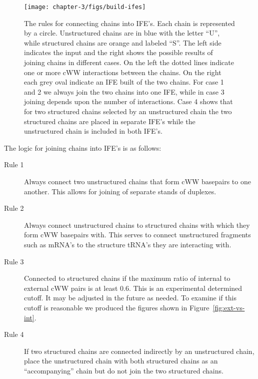 \begin{figure}
  \texttt{[image: chapter-3/figs/build-ifes]}
  \caption{The rules for connecting chains into IFE's. Each chain is
    represented by a circle. Unstructured chains are in blue with the letter
    ``U'', while structured chains are orange and labeled ``S''. The left side
    indicates the input and the right shows the possible results of joining
    chains in different cases. On the left the dotted lines indicate one or more
    cWW interactions between the chains. On the right each grey oval indicate
    an IFE built of the two chains. For case 1 and 2 we always join the two
    chains into one IFE, while in case 3 joining depends upon the number of
    interactions. Case 4 shows that for two structured chains selected by an
    unstructured chain the two structured chains are placed in separate IFE's
    while the unstructured chain is included in both IFE's.}
\label{fig:build-ife}
\end{figure}

The logic for joining chains into IFE's is as follows:

\begin{description}
  \item[Rule 1] Always connect two unstructured chains that form cWW basepairs
    to one another. This
    allows for joining of separate stands of duplexes.

  \item[Rule 2] Always connect unstructured chains to structured chains with
    which they form cWW basepairs with. This serves to connect unstructured
    fragments such as mRNA's to the structure tRNA's they are interacting with.

  \item[Rule 3] Connected to structured chains if the maximum ratio of internal
    to external cWW pairs is at least 0.6. This is an experimental determined
    cutoff. It may be adjusted in the future as needed. To examine if this
    cutoff is reasonable we produced the figures shown in
    Figure~\ref{fig:ext-vs-int}.

  \item[Rule 4] If two structured chains are connected indirectly by an
    unstructured chain, place the unstructured chain with both structured chains
    as an ``accompanying'' chain but do not join the two structured chains.
\end{description}

